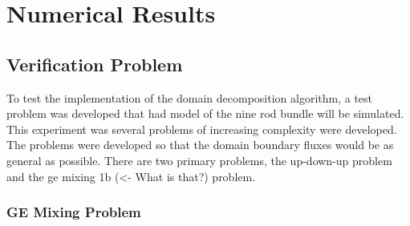 \chapter{Numerical Results}
\label{chap:results}


\section{Verification Problem}
\label{sec:dd:verify}
To test the implementation of the domain decomposition algorithm, a test problem was developed that had model of the nine rod bundle will be simulated. 
This experiment was several problems of increasing complexity were developed.
The problems were developed so that the domain boundary fluxes would be as general as possible.
There are two primary problems, the up-down-up problem and the ge mixing 1b (<- What is that?) problem.

\subsection{GE Mixing Problem}
\label{ss:dd:ver:gem}

